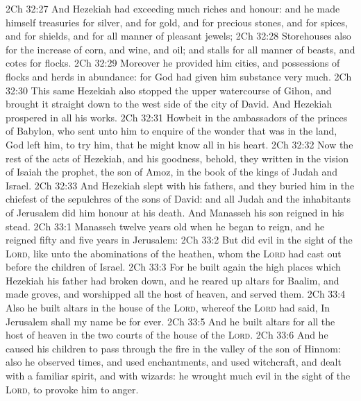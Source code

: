 \vs 2Ch 32:27 And Hezekiah had exceeding much riches and honour: and he made himself treasuries for silver, and for gold, and for precious stones, and for spices, and for shields, and for all manner of pleasant jewels;
\vs 2Ch 32:28 Storehouses also for the increase of corn, and wine, and oil; and stalls for all manner of beasts, and cotes for flocks.
\vs 2Ch 32:29 Moreover he provided him cities, and possessions of flocks and herds in abundance: for God had given him substance very much.
\vs 2Ch 32:30 This same Hezekiah also stopped the upper watercourse of Gihon, and brought it straight down to the west side of the city of David. And Hezekiah prospered in all his works.
\vs 2Ch 32:31 Howbeit in  the ambassadors of the princes of Babylon, who sent unto him to enquire of the wonder that was  in the land, God left him, to try him, that he might know all  in his heart.
\vs 2Ch 32:32 Now the rest of the acts of Hezekiah, and his goodness, behold, they  written in the vision of Isaiah the prophet, the son of Amoz,  in the book of the kings of Judah and Israel.
\vs 2Ch 32:33 And Hezekiah slept with his fathers, and they buried him in the chiefest of the sepulchres of the sons of David: and all Judah and the inhabitants of Jerusalem did him honour at his death. And Manasseh his son reigned in his stead.
\vs 2Ch 33:1 Manasseh  twelve years old when he began to reign, and he reigned fifty and five years in Jerusalem:
\vs 2Ch 33:2 But did  evil in the sight of the \textsc{Lord}, like unto the abominations of the heathen, whom the \textsc{Lord} had cast out before the children of Israel.
\vs 2Ch 33:3 For he built again the high places which Hezekiah his father had broken down, and he reared up altars for Baalim, and made groves, and worshipped all the host of heaven, and served them.
\vs 2Ch 33:4 Also he built altars in the house of the \textsc{Lord}, whereof the \textsc{Lord} had said, In Jerusalem shall my name be for ever.
\vs 2Ch 33:5 And he built altars for all the host of heaven in the two courts of the house of the \textsc{Lord}.
\vs 2Ch 33:6 And he caused his children to pass through the fire in the valley of the son of Hinnom: also he observed times, and used enchantments, and used witchcraft, and dealt with a familiar spirit, and with wizards: he wrought much evil in the sight of the \textsc{Lord}, to provoke him to anger.
